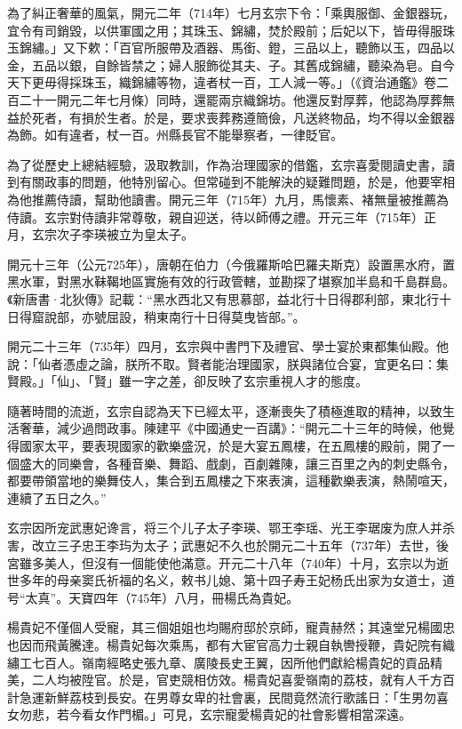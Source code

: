 為了糾正奢華的風氣，開元二年（714年）七月玄宗下令：「乘輿服御、金銀器玩，宜令有司銷毀，以供軍國之用；其珠玉、錦繡，焚於殿前；后妃以下，皆毋得服珠玉錦繡。」又下欶：「百官所服帶及酒器、馬銜、鐙，三品以上，聽飾以玉，四品以金，五品以銀，自餘皆禁之；婦人服飾從其夫、子。其舊成錦繡，聽染為皂。自今天下更毋得採珠玉，織錦繡等物，違者杖一百，工人減一等。」（《資治通鑑》卷二百二十一開元二年七月條）同時，還罷兩京織錦坊。他還反對厚葬，他認為厚葬無益於死者，有損於生者。於是，要求喪葬務遵簡儉，凡送終物品，均不得以金銀器為飾。如有違者，杖一百。州縣長官不能舉察者，一律貶官。

為了從歷史上總結經驗，汲取教訓，作為治理國家的借鑑，玄宗喜愛閱讀史書，讀到有關政事的問題，他特別留心。但常碰到不能解決的疑難問題，於是，他要宰相為他推薦侍讀，幫助他讀書。開元三年（715年）九月，馬懷素、褚無量被推薦為侍讀。玄宗對侍讀非常尊敬，親自迎送，待以師傅之禮。开元三年（715年）正月，玄宗次子李瑛被立为皇太子。

開元十三年（公元725年），唐朝在伯力（今俄羅斯哈巴羅夫斯克）設置黑水府，置黑水軍，對黑水靺鞨地區實施有效的行政管轄，並勘探了堪察加半島和千島群島。《新唐書·北狄傳》記載：“黑水西北又有思慕部，益北行十日得郡利部，東北行十日得窟說部，亦號屈設，稍東南行十日得莫曳皆部。”。

開元二十三年（735年）四月，玄宗與中書門下及禮官、學士宴於東都集仙殿。他說：「仙者憑虛之論，朕所不取。賢者能治理國家，朕與諸位合宴，宜更名曰：集賢殿。」「仙」、「賢」雖一字之差，卻反映了玄宗重視人才的態度。

隨著時間的流逝，玄宗自認為天下已經太平，逐漸喪失了積極進取的精神，以致生活奢華，減少過問政事。陳建平《中國通史一百講》：“開元二十三年的時候，他覺得國家太平，要表現國家的歡樂盛況，於是大宴五鳳樓，在五鳳樓的殿前，開了一個盛大的同樂會，各種音樂、舞蹈、戲劇，百劇雜陳，讓三百里之內的刺史縣令，都要帶領當地的樂舞伎人，集合到五鳳樓之下來表演，這種歡樂表演，熱鬧喧天，連續了五日之久。”

玄宗因所宠武惠妃谗言，将三个儿子太子李瑛、鄂王李瑶、光王李琚废为庶人并杀害，改立三子忠王李玙为太子；武惠妃不久也於開元二十五年（737年）去世，後宮雖多美人，但沒有一個能使他滿意。开元二十八年（740年）十月，玄宗以为逝世多年的母亲窦氏祈福的名义，敕书儿媳、第十四子寿王妃杨氏出家为女道士，道号“太真”。天寶四年（745年）八月，冊楊氏為貴妃。

楊貴妃不僅個人受寵，其三個姐姐也均賜府邸於京師，寵貴赫然；其遠堂兄楊國忠也因而飛黃騰達。楊貴妃每次乘馬，都有大宦官高力士親自執轡授鞭，貴妃院有織繡工七百人。嶺南經略史張九章、廣陵長史王翼，因所他們獻給楊貴妃的貢品精美，二人均被陞官。於是，官吏競相仿效。楊貴妃喜愛嶺南的荔枝，就有人千方百計急運新鮮荔枝到長安。在男尊女卑的社會裏，民間竟然流行歌謠日：「生男勿喜女勿悲，若今看女作門楣。」可見，玄宗寵愛楊貴妃的社會影響相當深遠。

